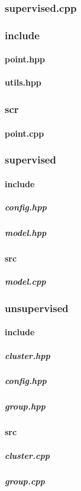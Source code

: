 \documentclass[12pt]{article}
\newcommand{\incDemo}[2]{\label{demo:#2}\newpage}
\begin{document}
\subsubsection{supervised.cpp}									\incDemo{c++}{supervised.cpp}
\subsubsection{include}													%
\paragraph{point.hpp}													\incDemo{c++}{include/point.hpp}
\paragraph{utils.hpp}														\incDemo{c++}{include/utils.hpp}
\subsubsection{scr}														%
\paragraph{point.cpp}													\incDemo{c++}{scr/point.cpp}
\subsubsection{supervised}											%
\paragraph{include}														%
\subparagraph{config.hpp}											\incDemo{c++}{supervised/include/config.hpp}
\subparagraph{model.hpp}											\incDemo{c++}{supervised/include/model.hpp}
\paragraph{src}																%
\subparagraph{model.cpp}												\incDemo{c++}{supervised/src/model.cpp}
\subsubsection{unsupervised}										%
\paragraph{include}														%
\subparagraph{cluster.hpp}											\incDemo{c++}{unsupervised/include/cluster.hpp}
\subparagraph{config.hpp}											\incDemo{c++}{unsupervised/include/config.hpp}
\subparagraph{group.hpp}												\incDemo{c++}{unsupervised/include/group.hpp}
\paragraph{src}																%
\subparagraph{cluster.cpp}											\incDemo{c++}{unsupervised/src/cluster.cpp}
\subparagraph{group.cpp}												\incDemo{c++}{unsupervised/src/group.cpp}
\end{document}
